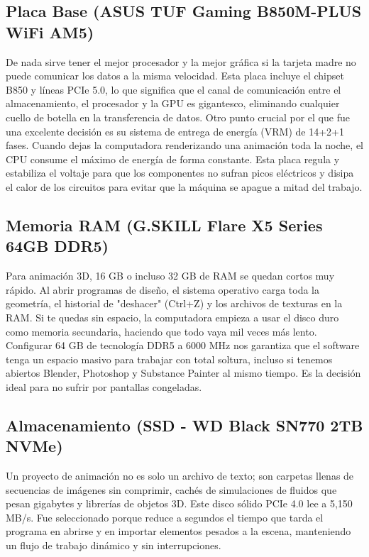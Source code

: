 \documentclass[14pt,a4paper]{extarticle}
\begin{document}
\subsection*{\centering Placa Base (ASUS TUF Gaming B850M-PLUS WiFi AM5)}
De nada sirve tener el mejor procesador y la mejor gráfica si la tarjeta madre no puede comunicar los datos a la misma velocidad. Esta placa incluye el chipset B850 y líneas PCIe 5.0, lo que significa que el canal de comunicación entre el almacenamiento, el procesador y la GPU es gigantesco, eliminando cualquier cuello de botella en la transferencia de datos. Otro punto crucial por el que fue una excelente decisión es su sistema de entrega de energía (VRM) de 14+2+1 fases. Cuando dejas la computadora renderizando una animación toda la noche, el CPU consume el máximo de energía de forma constante. Esta placa regula y estabiliza el voltaje para que los componentes no sufran picos eléctricos y disipa el calor de los circuitos para evitar que la máquina se apague a mitad del trabajo.

\subsection*{\centering Memoria RAM (G.SKILL Flare X5 Series 64GB DDR5)}
Para animación 3D, 16 GB o incluso 32 GB de RAM se quedan cortos muy rápido. Al abrir programas de diseño, el sistema operativo carga toda la geometría, el historial de "deshacer" (Ctrl+Z) y los archivos de texturas en la RAM. Si te quedas sin espacio, la computadora empieza a usar el disco duro como memoria secundaria, haciendo que todo vaya mil veces más lento. Configurar 64 GB de tecnología DDR5 a 6000 MHz nos garantiza que el software tenga un espacio masivo para trabajar con total soltura, incluso si tenemos abiertos Blender, Photoshop y Substance Painter al mismo tiempo. Es la decisión ideal para no sufrir por pantallas congeladas.

\subsection*{\centering Almacenamiento (SSD - WD Black SN770 2TB NVMe)}
Un proyecto de animación no es solo un archivo de texto; son carpetas llenas de secuencias de imágenes sin comprimir, cachés de simulaciones de fluidos que pesan gigabytes y librerías de objetos 3D. Este disco sólido PCIe 4.0 lee a 5,150 MB/s. Fue seleccionado porque reduce a segundos el tiempo que tarda el programa en abrirse y en importar elementos pesados a la escena, manteniendo un flujo de trabajo dinámico y sin interrupciones.
\end{document}
